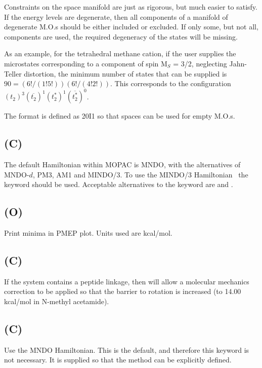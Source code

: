        Constraints on the space manifold are just  as  rigorous,  but  much
   easier  to  satisfy.   If  the  energy  levels  are  degenerate, then all
   components of a manifold of degenerate M.O.s should be  either  included
   or  excluded.   If  only  some,  but  not  all,  components are used, the
   required degeneracy of the states will be missing.

        As an example, for the  tetrahedral  methane  cation,  if  the  user
   supplies  the  microstates  corresponding  to  a component of spin M$_S$ = 3/2,
   neglecting Jahn-Teller distortion, the minimum number of states that  can
   be supplied is $90 = (6!/(1!5!))(6!/(4!2!))$.  This corresponds to the
configuration $(t_2)^3(\overline{t_2})^1(t_2^*)^1(\overline{t_2^*})^0$.


        The format is defined as 20I1 so that spaces can be used  for  empty
   M.O.s.

\subsection*{ (C)}
        The default Hamiltonian within MOPAC is MNDO, with the  alternatives
   of  MNDO-$d$, PM3, AM1  and MINDO/3.  To use the MINDO/3
Hamiltonian~\cite{mindo3}
the keyword 
should be used.  Acceptable alternatives to the keyword  are 
   and .
\subsection*{ (O)}
Print minima in PMEP plot.  Units used are kcal/mol.

\subsection*{ (C)}
        If the system contains a peptide linkage, then    will  allow  a
   molecular  mechanics  correction  to  be  applied  so that the barrier to
   rotation is increased (to 14.00 kcal/mol in N-methyl acetamide).

\subsection*{ (C)}
Use the MNDO Hamiltonian.  This is the default, and therefore this keyword is
not necessary.  It is supplied so that the method can be explicitly defined.

